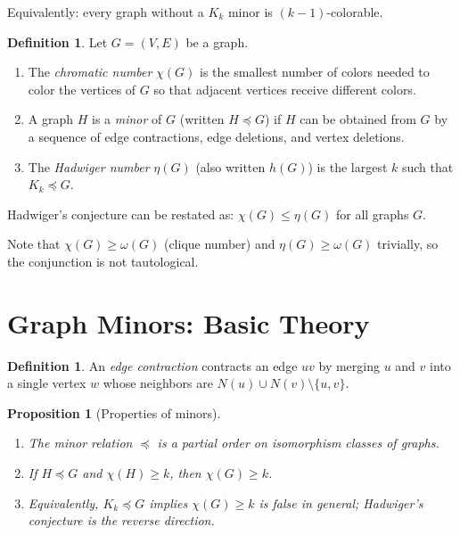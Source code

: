 \documentclass[12pt,a4paper]{amsart}
\newtheorem{proposition}[theorem]{Proposition}
\theoremstyle{definition}
\newtheorem{definition}[theorem]{Definition}
\theoremstyle{remark}
\begin{document}
Equivalently: every graph without a $K_k$ minor is $(k-1)$-colorable.

\begin{definition}
Let $G = (V,E)$ be a graph.
\begin{enumerate}[label=(\alph*)]
  \item The \emph{chromatic number} $\chi(G)$ is the smallest number of colors
        needed to color the vertices of $G$ so that adjacent vertices receive
        different colors.
  \item A graph $H$ is a \emph{minor} of $G$ (written $H \preceq G$) if $H$ can
        be obtained from $G$ by a sequence of edge contractions, edge deletions,
        and vertex deletions.
  \item The \emph{Hadwiger number} $\eta(G)$ (also written $h(G)$) is the largest
        $k$ such that $K_k \preceq G$.
\end{enumerate}
\end{definition}

Hadwiger's conjecture can be restated as: $\chi(G) \leq \eta(G)$ for all graphs $G$.

Note that $\chi(G) \geq \omega(G)$ (clique number) and $\eta(G) \geq \omega(G)$
trivially, so the conjunction is not tautological.

\section{Graph Minors: Basic Theory}

\begin{definition}
An \emph{edge contraction} contracts an edge $uv$ by merging $u$ and $v$ into
a single vertex $w$ whose neighbors are $N(u) \cup N(v) \setminus \{u,v\}$.
\end{definition}

\begin{proposition}[Properties of minors]\label{prop:minorprop}
\begin{enumerate}[label=(\roman*)]
  \item The minor relation $\preceq$ is a partial order on isomorphism classes
        of graphs.
  \item If $H \preceq G$ and $\chi(H) \geq k$, then $\chi(G) \geq k$.
  \item Equivalently, $K_k \preceq G$ implies $\chi(G) \geq k$ is false in general;
        Hadwiger's conjecture is the reverse direction.
\end{enumerate}
\end{proposition}
\end{document}
